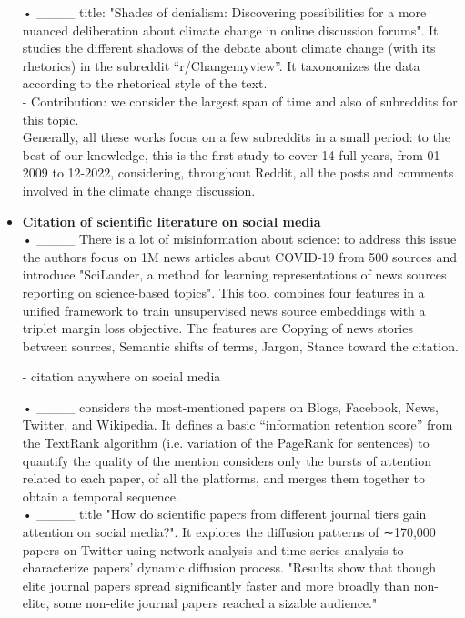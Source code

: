 \begin{itemize}
• ____ title: "Shades of denialism: Discovering possibilities for a more nuanced deliberation about climate change in online discussion forums".  It studies the different shadows of the debate about climate change (with its rhetorics) in the subreddit “r/Changemyview”. It taxonomizes the data according to the rhetorical style of the text.\\




- Contribution: we consider the largest span of time and also of subreddits for this topic.\\
Generally, all these works focus on a few subreddits in a small period: to the best of our knowledge, this is the first study to cover 14 full years, from 01-2009 to 12-2022, considering, throughout Reddit, all the posts and comments involved in the climate change discussion. \\



\item \textbf{Citation of scientific literature on social media}\\

• ____ There is a lot of misinformation about science: to address this issue the authors focus on 1M news articles about COVID-19 from 500 sources and introduce "SciLander, a method for learning representations of news sources reporting on science-based topics". This tool combines four features in a unified framework to train unsupervised news source embeddings with a triplet margin loss objective. The features are Copying of news stories between sources, Semantic shifts of terms, Jargon, Stance toward the citation.


- citation anywhere on social media

• ____ considers the most-mentioned papers on Blogs, Facebook, News, Twitter, and Wikipedia. It defines a basic “information retention score” from the TextRank algorithm (i.e. variation of the PageRank for sentences) to quantify the quality of the mention considers only the bursts of attention related to each paper, of all the platforms, and merges them together to obtain a temporal sequence. \\

• ____ title "How do scientific papers from different journal tiers gain attention on social media?". It explores the diffusion patterns of ∼170,000 papers on Twitter using network analysis and time series analysis to characterize papers’ dynamic diffusion process. "Results show that though elite journal papers spread significantly faster and more broadly than non-elite, some non-elite journal papers reached a sizable audience."\\


\end{itemize}
